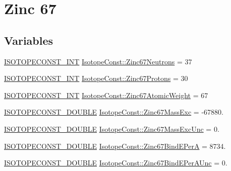 \hypertarget{group___isotope_const-_zinc-_zn67}{}\section{Zinc 67}
\label{group___isotope_const-_zinc-_zn67}
\subsection*{Variables}
\begin{DoxyCompactItemize}
\item 
\mbox{\hyperlink{group___isotope_const-_macros_ga5f18360b3e99483a35c32d789e62621c}{I\+S\+O\+T\+O\+P\+E\+C\+O\+N\+S\+T\+\_\+\+I\+NT}} \mbox{\hyperlink{group___isotope_const-_zinc-_zn67_gaea181abc7febeae6e6bc19e7e8f9301b}{Isotope\+Const\+::\+Zinc67\+Neutrons}} = 37
\item 
\mbox{\hyperlink{group___isotope_const-_macros_ga5f18360b3e99483a35c32d789e62621c}{I\+S\+O\+T\+O\+P\+E\+C\+O\+N\+S\+T\+\_\+\+I\+NT}} \mbox{\hyperlink{group___isotope_const-_zinc-_zn67_ga0892e3b268e34cb00ca749715dfb3684}{Isotope\+Const\+::\+Zinc67\+Protons}} = 30
\item 
\mbox{\hyperlink{group___isotope_const-_macros_ga5f18360b3e99483a35c32d789e62621c}{I\+S\+O\+T\+O\+P\+E\+C\+O\+N\+S\+T\+\_\+\+I\+NT}} \mbox{\hyperlink{group___isotope_const-_zinc-_zn67_gabd9ca273b67acfe3c811281e48625abc}{Isotope\+Const\+::\+Zinc67\+Atomic\+Weight}} = 67
\item 
\mbox{\hyperlink{group___isotope_const-_macros_ga8f45a7272ce02c0b4c65c44636ed719a}{I\+S\+O\+T\+O\+P\+E\+C\+O\+N\+S\+T\+\_\+\+D\+O\+U\+B\+LE}} \mbox{\hyperlink{group___isotope_const-_zinc-_zn67_gab667a379bf48b1e1b3b9b02327398ab8}{Isotope\+Const\+::\+Zinc67\+Mass\+Exc}} = -\/67880.
\item 
\mbox{\hyperlink{group___isotope_const-_macros_ga8f45a7272ce02c0b4c65c44636ed719a}{I\+S\+O\+T\+O\+P\+E\+C\+O\+N\+S\+T\+\_\+\+D\+O\+U\+B\+LE}} \mbox{\hyperlink{group___isotope_const-_zinc-_zn67_ga7a85f2d714ef8cbbf6e58b5bd88f2e6f}{Isotope\+Const\+::\+Zinc67\+Mass\+Exc\+Unc}} = 0.
\item 
\mbox{\hyperlink{group___isotope_const-_macros_ga8f45a7272ce02c0b4c65c44636ed719a}{I\+S\+O\+T\+O\+P\+E\+C\+O\+N\+S\+T\+\_\+\+D\+O\+U\+B\+LE}} \mbox{\hyperlink{group___isotope_const-_zinc-_zn67_ga618d2f865442ec0f253f1b1a2ecf784a}{Isotope\+Const\+::\+Zinc67\+Bind\+E\+PerA}} = 8734.
\item 
\mbox{\hyperlink{group___isotope_const-_macros_ga8f45a7272ce02c0b4c65c44636ed719a}{I\+S\+O\+T\+O\+P\+E\+C\+O\+N\+S\+T\+\_\+\+D\+O\+U\+B\+LE}} \mbox{\hyperlink{group___isotope_const-_zinc-_zn67_ga7876e01f19b78af7641616fa6794c24e}{Isotope\+Const\+::\+Zinc67\+Bind\+E\+Per\+A\+Unc}} = 0.

\end{DoxyCompactItemize}
